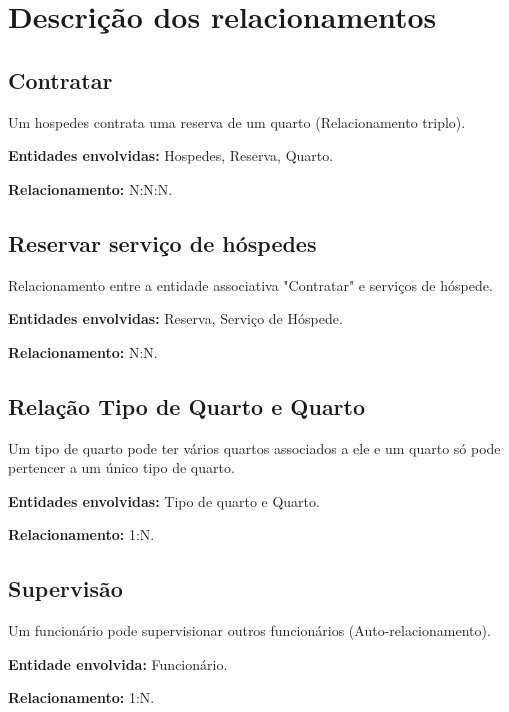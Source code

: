 \newpage

\section{Descrição dos relacionamentos}

\subsection{Contratar}

Um hospedes contrata uma reserva de um quarto (Relacionamento triplo).

\textbf{Entidades envolvidas: }Hospedes, Reserva, Quarto.

\textbf{Relacionamento: } N:N:N.

\subsection{Reservar serviço de hóspedes}

Relacionamento entre a entidade associativa "Contratar" e serviços de hóspede.

\textbf{Entidades envolvidas: }Reserva, Serviço de Hóspede.

\textbf{Relacionamento: } N:N.

\subsection{Relação Tipo de Quarto e Quarto}

Um tipo de quarto pode ter vários quartos associados a ele e um quarto só pode pertencer a um único tipo de quarto.

\textbf{Entidades envolvidas: }Tipo de quarto e Quarto.

\textbf{Relacionamento: } 1:N.

\subsection{Supervisão}

Um funcionário pode supervisionar outros funcionários (Auto-relacionamento).

\textbf{Entidade envolvida: }Funcionário.

\textbf{Relacionamento: } 1:N.


